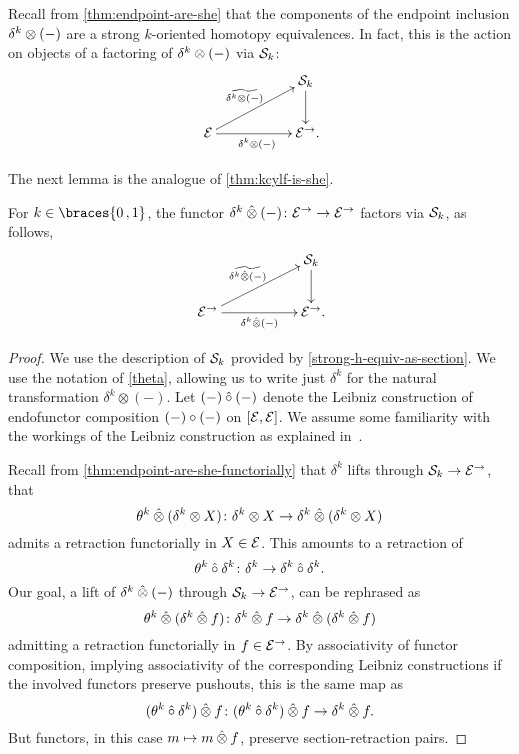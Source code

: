 \documentclass[reqno,10pt,a4paper,oneside,draft]{amsart}
\begin{document}
{{\begin{remark} \label{thm:endpoint-are-she-functorially}
Recall from \cref{thm:endpoint-are-she} that the components of the endpoint inclusion $\kcyl \otimes (-)$ are a strong $k$-oriented homotopy equivalences.
In fact, this is the action on objects of a factoring of $\kcyl \otimes (-)$ via $\cal{S}_k$:
\[
\xymatrix@C+3em{
&
  \cal{S}_k
  \ar[d]
\\
  \cal{E}
  \ar[r]_{\kcyl \otimes (-)}
  \ar[ur]^{\widetilde{\kcyl \otimes (-)}}
&
  \cal{E}^\to
\rlap{.}}
\]
\end{remark}

The next lemma is the analogue of \cref{thm:kcylf-is-she}.

\begin{lemma} \label{thm:kcylf-is-she-alg}
For $k \in \braces{0\,, 1}$, the functor $\kcyl \hatotimes (-) \co \cal{E}^\to \to \cal{E}^\to$ factors via $\cal{S}_k$, as follows,
\[
\xymatrix@C+3em{
&
  \cal{S}_k
  \ar[d]
\\
  \cal{E}^\to
  \ar[r]_-{\kcyl \hatotimes (-)}
  \ar[ur]^-{\widetilde{\kcyl \hatotimes (-)}\,}
&
  \cal{E}^\to
\rlap{.}}
\]
\end{lemma}

\begin{proof}
We use the description of $\cal{S}_k$ provided by \cref{strong-h-equiv-as-section}.
We use the notation of \cref{theta}, allowing us to write just $\delta^k$ for the natural transformation $\delta^k \otimes (-)$.
Let $(-) \mathbin{\hat{\cc}} (-)$ denote the Leibniz construction of endofunctor composition $(-) \cc (-)$ on $[\cal{E}, \cal{E}]$.
We assume some familiarity with the workings of the Leibniz construction as explained in~\cite{riehl-verity:reedy}.

Recall from \cref{thm:endpoint-are-she-functorially} that $\delta^k$ lifts through $\cal{S}_k \to \cal{E}^\to$, \ie that
\[
  \theta^k \hatotimes (\delta^k \otimes X) \co \delta^k \otimes X \to \delta^k \hatotimes (\delta^k \otimes X)
\]
admits a retraction functorially in $X \in \cal{E}$.
This amounts to a retraction of
\[
  \theta^k \mathbin{\hat{\cc}} \delta^k \co \delta^k \to \delta^k \mathbin{\hat{\cc}} \delta^k
.\]
Our goal, a lift of $\delta^k \hatotimes (-)$ through $\cal{S}_k \to \cal{E}^\to$, can be rephrased as
\[
  \theta^k \hatotimes (\delta^k \hatotimes f) \co \delta^k \hatotimes f \to \delta^k \hatotimes (\delta^k \hatotimes f)
\]
admitting a retraction functorially in $f \in \cal{E}^\to$.
By associativity of functor composition, implying associativity of the corresponding Leibniz constructions if the involved functors preserve pushouts, this is the same map as
\[
  (\theta^k \mathbin{\hat{\cc}} \delta^k) \hatotimes f \co (\theta^k \mathbin{\hat{\cc}} \delta^k) \hatotimes f \to \delta^k \hatotimes f
.\]
But functors, in this case $m \mapsto m \hatotimes f$, preserve section-retraction pairs.
\end{proof}

}}
\end{document}
